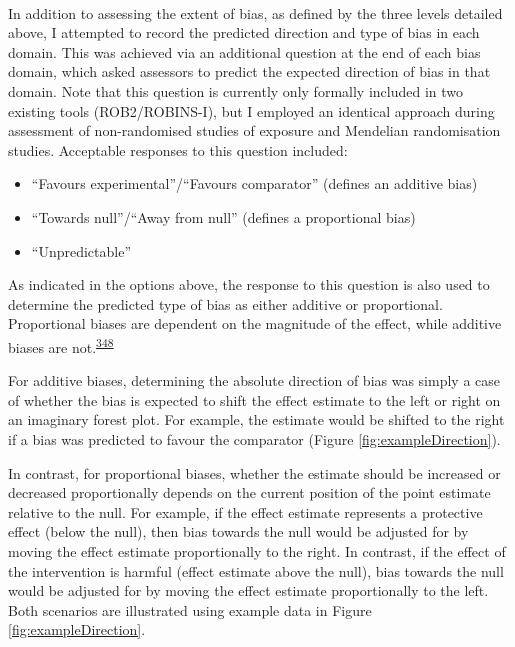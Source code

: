 \documentclass[a4paper, twoside]{templates/ociamthesis}
\providecommand{\tightlist}{%
  \setlength{\itemsep}{0pt}\setlength{\parskip}{0pt}}
\begin{document}
~

In addition to assessing the extent of bias, as defined by the three levels detailed above, I attempted to record the predicted direction and type of bias in each domain. This was achieved via an additional question at the end of each bias domain, which asked assessors to predict the expected direction of bias in that domain. Note that this question is currently only formally included in two existing tools (ROB2/ROBINS-I), but I employed an identical approach during assessment of non-randomised studies of exposure and Mendelian randomisation studies. Acceptable responses to this question included:

\begin{itemize}
\tightlist
\item
  ``Favours experimental''/``Favours comparator'' (defines an additive bias)
\item
  ``Towards null''/``Away from null'' (defines a proportional bias)
\item
  ``Unpredictable''
\end{itemize}

As indicated in the options above, the response to this question is also used to determine the predicted type of bias as either additive or proportional. Proportional biases are dependent on the magnitude of the effect, while additive biases are not.\textsuperscript{\protect\hyperlink{ref-turner2009}{348}}

For additive biases, determining the absolute direction of bias was simply a case of whether the bias is expected to shift the effect estimate to the left or right on an imaginary forest plot. For example, the estimate would be shifted to the right if a bias was predicted to favour the comparator (Figure \ref{fig:exampleDirection}).

In contrast, for proportional biases, whether the estimate should be increased or decreased proportionally depends on the current position of the point estimate relative to the null. For example, if the effect estimate represents a protective effect (below the null), then bias towards the null would be adjusted for by moving the effect estimate proportionally to the right. In contrast, if the effect of the intervention is harmful (effect estimate above the null), bias towards the null would be adjusted for by moving the effect estimate proportionally to the left. Both scenarios are illustrated using example data in Figure \ref{fig:exampleDirection}.
\end{document}
